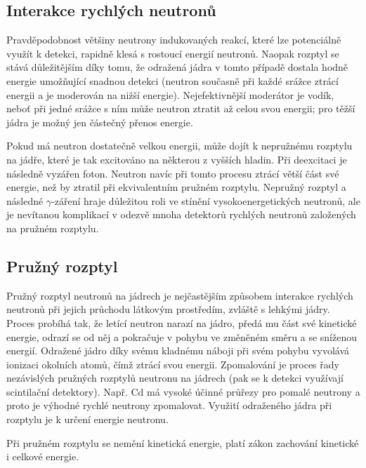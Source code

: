 \documentclass[../../main.tex]{subfiles}
\begin{document}
\subsection{Interakce rychlých neutronů}

Pravděpodobnost většiny neutrony indukovaných reakcí, které lze potenciálně využít k detekci, rapidně klesá s rostoucí energií neutronů. Naopak rozptyl se stává důležitějším díky tomu, že odražená jádra v tomto případě dostala hodně energie umožňující snadnou detekci (neutron současně při každé srážce ztrácí energii a je moderován na nižší energie). Nejefektivnější moderátor je vodík, neboť při jedné srážce s ním může neutron ztratit až celou svou energii; pro těžší jádra je možný jen částečný přenos energie.

Pokud má neutron dostatečně velkou energii, může dojít k nepružnému rozptylu na jádře, které je tak excitováno na některou z vyšších hladin. Při deexcitaci je následně vyzářen foton. Neutron navíc při tomto procesu ztrácí větší část své energie, než by ztratil při ekvivalentním pružném rozptylu. Nepružný rozptyl a následné $\gamma$-záření hraje důležitou roli ve stínění vysokoenergetických neutronů, ale je nevítanou komplikací v odezvě mnoha detektorů rychlých neutronů založených na pružném rozptylu.

\subsection{Pružný rozptyl}

Pružný rozptyl neutronů na jádrech je nejčastějším způsobem interakce rychlých neutronů při jejich průchodu látkovým prostředím, zvláště s lehkými jádry. Proces probíhá tak, že letící neutron narazí na jádro, předá mu část své kinetické energie, odrazí se od něj a pokračuje v pohybu ve změněném směru a se sníženou energií. Odražené jádro díky svému kladnému náboji při svém pohybu vyvolává ionizaci okolních atomů, čímž ztrácí svou energii. Zpomalování je proces řady nezávislých pružných rozptylů neutronu na jádrech (pak se k detekci využívají scintilační detektory). Např. Cd má vysoké účinné průřezy pro pomalé neutrony a proto je výhodné rychlé neutrony zpomalovat. Využití odraženého jádra při rozptylu je k určení energie neutronu. 

Při pružném rozptylu se nemění kinetická energie, platí zákon zachování kinetické i celkové energie. 
\end{document}
